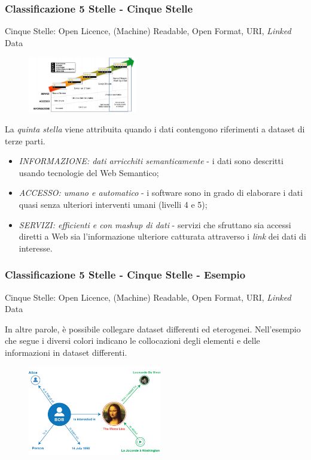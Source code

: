 \documentclass[8pt]{beamer}
\begin{document}
\begin{frame}
  \frametitle{Classificazione 5 Stelle - Cinque Stelle}
  
  Cinque Stelle: Open Licence, (Machine) Readable, Open Format, URI, \emph{Linked} Data

  \begin{figure}
     \includegraphics[width=180px]{stella5.png} 
  \end{figure}
  
  La \emph{quinta stella} viene attribuita quando i dati contengono riferimenti a dataset di terze parti.
  \vspace{\baselineskip}

  \begin{itemize}[<+->]
   \item \emph{INFORMAZIONE: dati arricchiti semanticamente} - i dati sono descritti usando tecnologie del Web Semantico;
   \item \emph{ACCESSO: umano e automatico} - i software sono in grado di elaborare i dati quasi senza ulteriori 
   interventi umani (livelli 4 e 5);
   \item \emph{SERVIZI: efficienti e con mashup di dati} - servizi che sfruttano sia accessi diretti a Web 
   sia l'informazione ulteriore catturata attraverso i \emph{link} dei dati di interesse.
  \end{itemize}
\end{frame}

\begin{frame}
  \frametitle{Classificazione 5 Stelle - Cinque Stelle - Esempio}
  
  Cinque Stelle: Open Licence, (Machine) Readable, Open Format, URI, \emph{Linked} Data
  \vspace{\baselineskip}
  
  In altre parole, \`e possibile collegare dataset differenti ed eterogenei.
  Nell'esempio che segue i diversi colori indicano le collocazioni degli
  elementi e delle informazioni in dataset differenti.

  \begin{figure}
     \includegraphics[width=220px]{example-graph.jpg} 
  \end{figure}  
\end{frame}
\end{document}
